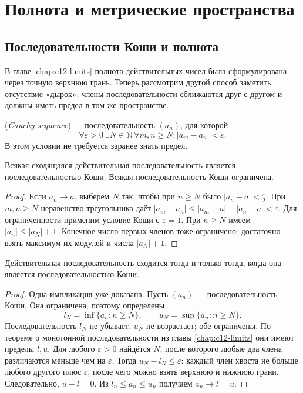 \chapter{Полнота и метрические пространства}\label{chap:c28}

\section{Последовательности Коши и полнота}
В главе \ref{chap:c12-limits} полнота действительных чисел была сформулирована через точную верхнюю грань. Теперь рассмотрим другой способ заметить отсутствие «дырок»: члены последовательности сближаются друг с другом и должны иметь предел в том же пространстве.

\begin{definition}
 (\emph{Cauchy sequence}) — последовательность \((a_n)\), для которой
\[
 \forall\varepsilon>0\ \exists N\in\mathbb N\ \forall m,n\ge N:
 |a_m-a_n|<\varepsilon.
\]
В этом условии не требуется заранее знать предел.
\end{definition}
\begin{theorem}\label{thm:legacy-c28-1}
Всякая сходящаяся действительная последовательность является последовательностью Коши. Всякая последовательность Коши ограничена.
\end{theorem}
\begin{proof}
Если \(a_n\to a\), выберем \(N\) так, чтобы при \(n\ge N\) было \(|a_n-a|<\frac\varepsilon2\). При \(m,n\ge N\) неравенство треугольника даёт \(|a_m-a_n|\le|a_m-a|+|a_n-a|<\varepsilon\).
Для ограниченности применим условие Коши с \(\varepsilon=1\). При \(n\ge N\) имеем \(|a_n|\le|a_N|+1\). Конечное число первых членов тоже ограничено: достаточно взять максимум их модулей и числа \(|a_N|+1\).
\end{proof}
\begin{theorem}\label{thm:legacy-c28-2}
Действительная последовательность сходится тогда и только тогда, когда она является последовательностью Коши.
\end{theorem}
\begin{proof}
Одна импликация уже доказана. Пусть \((a_n)\) — последовательность Коши. Она ограничена, поэтому определены
\[
 l_N=\inf\{a_n:n\ge N\},\qquad u_N=\sup\{a_n:n\ge N\}.
\]
Последовательность \(l_N\) не убывает, \(u_N\) не возрастает; обе ограничены. По теореме о монотонной последовательности из главы \ref{chap:c12-limits} они имеют пределы \(l,u\). Для любого \(\varepsilon>0\) найдётся \(N\), после которого любые два члена различаются меньше чем на \(\varepsilon\). Тогда \(u_N-l_N\le\varepsilon\): каждый член хвоста не больше любого другого плюс \(\varepsilon\), после чего можно взять верхнюю и нижнюю грани. Следовательно, \(u-l=0\). Из \(l_n\le a_n\le u_n\) получаем \(a_n\to l=u\).
\end{proof}
